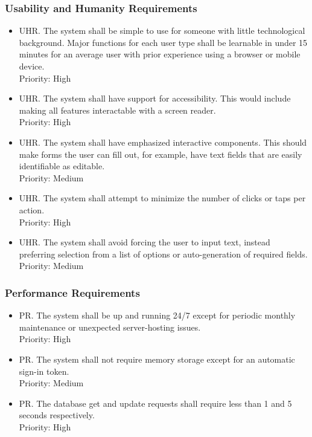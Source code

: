 \documentclass[12pt]{article}
\newcounter{uhrnum} %
\newcounter{prnum} %
\begin{document}
\subsubsection{Usability and Humanity Requirements}
\begin {itemize}
\item[UHR\refstepcounter{uhrnum}\theuhrnum \label{R_Output}.] The system shall be simple to use for someone with little technological background. Major functions for each user type shall be learnable in under 15 minutes for an average user with prior experience using a browser or mobile device.\\
    Priority: High
    
    \item[UHR\refstepcounter{uhrnum}\theuhrnum \label{R_Output}.] The system shall have support for accessibility. This would include making all features interactable with a screen reader. \\
    Priority: High
    
    \item[UHR\refstepcounter{uhrnum}\theuhrnum \label{R_Output}.] The system shall have emphasized interactive components. This should make forms the user can fill out, for example, have text fields that are easily identifiable as editable.\\
    Priority: Medium

    \item[UHR\refstepcounter{uhrnum}\theuhrnum \label{R_Output}.] The system shall attempt to minimize the number of clicks or taps per action.\\
    Priority: High

    \item[UHR\refstepcounter{uhrnum}\theuhrnum \label{R_Output}.] The system shall avoid forcing the user to input text, instead preferring selection from a list of options or auto-generation of required fields.\\
    Priority: Medium
\end {itemize}

\subsubsection{Performance Requirements}

\begin {itemize}
    \item[PR\refstepcounter{prnum}\theprnum \label{R_Output}.] The system shall be up and running 24/7 except for periodic monthly maintenance or unexpected server-hosting issues.\\
    Priority: High
    
    \item[PR\refstepcounter{prnum}\theprnum \label{R_Output}.] The system shall not require memory storage except for an automatic sign-in token.\\
    Priority: Medium
    
    \item[PR\refstepcounter{prnum}\theprnum \label{R_Output}.] The database get and update requests shall require less than 1 and 5 seconds respectively.\\
    Priority: High
\end {itemize}
\end{document}
